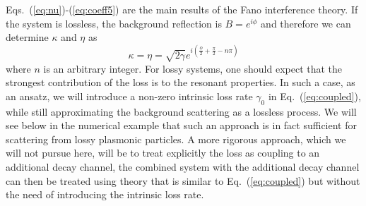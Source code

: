 \documentclass[preprint,aps]{revtex4}
\begin{document}
Eqs.~(\ref{eq:nu})-(\ref{eq:coeff5}) are the main results of the
Fano interference theory. If the system is lossless, the background
reflection is $B = e^{i \phi}$ and therefore we can determine
$\kappa$ and $\eta$ as
\begin{equation}
\label{eq:coeff2} \kappa  = \eta  = \sqrt {2\gamma }
{e^{i(\frac{\phi }{2} + \frac{\pi }{2} - n\pi )}}
\end{equation}
where $n$ is an arbitrary integer.  For lossy systems, one should
expect that the strongest contribution of the loss is to the
resonant properties. In such a case, as an ansatz, we will introduce
a non-zero intrinsic loss rate $\gamma_0$ in Eq.~(\ref{eq:coupled}),
while still approximating the background scattering as a lossless
process. We will see below in the numerical example that such an
approach is in fact sufficient for scattering from lossy plasmonic
particles. A more rigorous approach, which we will not pursue here,
will be to treat explicitly the loss as coupling to an additional
decay channel, the combined system with the additional decay channel
can then be treated using theory that is similar to
Eq.~(\ref{eq:coupled}) but without  the need of introducing the
intrinsic loss rate.
\end{document}
